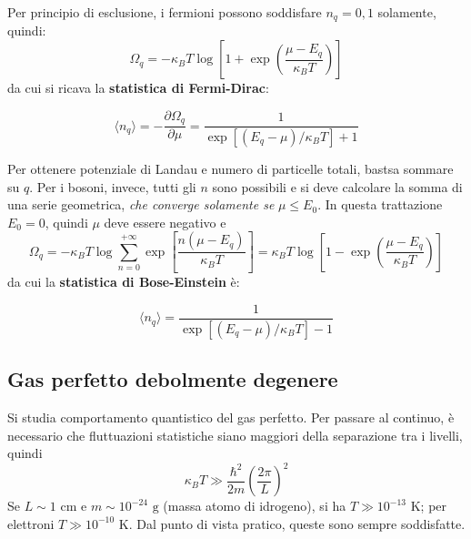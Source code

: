 \documentclass[10pt, a4paper]{scrartcl}
\numberwithin{equation}{subsection}
\theoremstyle{style1}
\newenvironment{boxenv}[1][]{
    \begin{eqbox}[#1]
    }{
   \end{eqbox}
}
\begin{document}
Per principio di esclusione, i fermioni possono soddisfare $n_q = 0,1$ solamente, quindi:
\begin{equation}\label{ofd}
	\Omega _q = -\kappa _B T \log \left[ 1+ \exp\left(\frac{\mu  - E_q}{\kappa _B T}\right)  \right] 
\end{equation}
da cui si ricava la \textbf{statistica di Fermi-Dirac}:
\begin{boxenv}[]
\begin{equation}
	\langle n_q \rangle = - \frac{\partial \Omega _q}{\partial \mu } = \frac{1}{\exp \left[ (E_q - \mu ) / \kappa_B T \right]  + 1}
\end{equation}
\end{boxenv}
\noindent Per ottenere potenziale di Landau e numero di particelle totali, bastsa sommare su $q$. Per i bosoni, invece, tutti gli $n$ sono possibili e si deve calcolare la somma di una serie geometrica, \textit{che converge solamente se} $\mu \le  E_0$. In questa trattazione $E_0=0$, quindi $\mu $ deve essere negativo e
\begin{equation}\label{obe}
	\Omega _q = - \kappa _B T \log \sum_{n=0}^{+\infty} \exp \left[ \frac{n(\mu  - E_q)}{\kappa _B T} \right] = \kappa _B T \log \left[1 - \exp\left(\frac{\mu  - E_q}{\kappa _B T}\right) \right]
\end{equation}
da cui la \textbf{statistica di Bose-Einstein} \`e:
\begin{boxenv}[]
\begin{equation}
	\langle n_q \rangle = \frac{1}{\exp\left[ (E_q - \mu )/\kappa _B T \right] - 1}
\end{equation}
\end{boxenv}
\subsection{Gas perfetto debolmente degenere}
Si studia comportamento quantistico del gas perfetto. Per passare al continuo, \`e necessario che fluttuazioni statistiche siano maggiori della separazione tra i livelli, quindi
\begin{equation}
	\kappa _B T \gg \frac{\hbar ^2}{2m} \left(\frac{2\pi}{L}\right) ^2
\end{equation}
Se $L\sim 1 \text{ cm}$ e $m\sim 10^{-24} \text{ g}$ (massa atomo di idrogeno), si ha $T \gg 10^{-13} $ K; per elettroni $T\gg 10^{-10} $ K. Dal punto di vista pratico, queste sono sempre soddisfatte.
\end{document}
